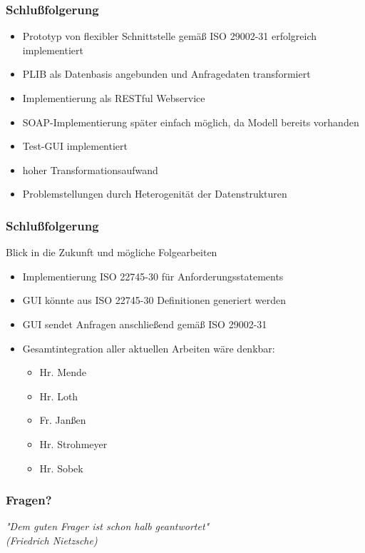 \documentclass[serif,mathserif]{beamer}
\begin{document}
\begin{frame}
  \frametitle{Schlußfolgerung}
  
  \begin{itemize}
	\item Prototyp von flexibler Schnittstelle gemäß ISO 29002-31 erfolgreich implementiert
	\item PLIB als Datenbasis angebunden und Anfragedaten transformiert
	\item Implementierung als RESTful Webservice
	\item SOAP-Implementierung später einfach möglich, da Modell bereits vorhanden
	\item Test-GUI implementiert 
	\item hoher Transformationsaufwand
	\item Problemstellungen durch Heterogenität der Datenstrukturen
   \end{itemize}

\end{frame}

\begin{frame}
  \frametitle{Schlußfolgerung}
  Blick in die Zukunft und mögliche Folgearbeiten
  \begin{itemize}
	\item Implementierung ISO 22745-30 für Anforderungsstatements
	\item GUI könnte aus ISO 22745-30 Definitionen generiert werden
	\item GUI sendet Anfragen anschließend gemäß ISO 29002-31
	\item Gesamtintegration aller aktuellen Arbeiten wäre denkbar:
	  \begin{itemize}
	  \item Hr. Mende
	  \item Hr. Loth 
	  \item Fr. Janßen
	  \item Hr. Strohmeyer
	  \item Hr. Sobek
	    \end{itemize}  
   \end{itemize}

\end{frame}

\begin{frame}
  \frametitle{Fragen?}
  
\textit{ "Dem guten Frager ist schon halb geantwortet"}\\
\textit{ (Friedrich Nietzsche)}

\end{frame}
\end{document}
